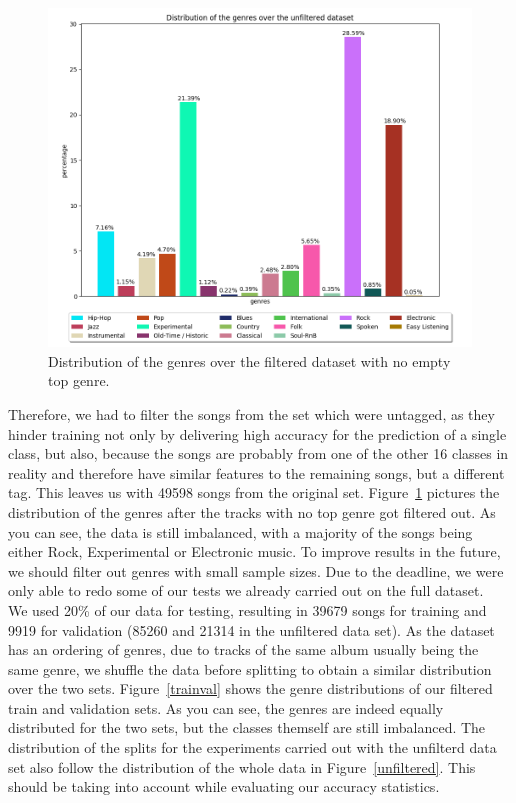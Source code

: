 \begin{figure}[]
	\centering
	\includegraphics[width=1.0\textwidth]{images/genredistfiltered.png}
	\caption{Distribution of the genres over the filtered dataset with no empty
	top genre.}	
	\label{filtered}
\end{figure}

Therefore, we had to filter the songs from the set which were untagged,
as they hinder training not only by delivering high accuracy for the
prediction of a single class, but also, because the songs are probably
from one of the other 16 classes in reality and therefore have similar
features to the remaining songs, but a different tag. This leaves us
with 49598 songs from the original set. Figure~\ref{filtered} pictures
the distribution of the genres after the tracks with no top genre got
filtered out. As you can see, the data is still imbalanced, with a
majority of the songs being either Rock, Experimental or Electronic
music. To improve results in the future, we should filter out genres
with small sample sizes. Due to the deadline, we were only able to redo
some of our tests we already carried out on the full dataset.\\
We used 20\% of our data for testing, resulting in 39679 songs for
training and 9919 for validation (85260 and 21314 in the unfiltered data
set). As the dataset has an ordering of genres, due to tracks of the
same album usually being the same genre, we shuffle the data before
splitting to obtain a similar distribution over the two sets.
Figure~\ref{trainval} shows the genre distributions of our filtered
train and validation sets. As you can see, the genres are indeed equally
distributed for the two sets, but the classes themself are still
imbalanced. The distribution of the splits for the experiments carried
out with the unfilterd data set also follow the distribution of the
whole data in Figure~\ref{unfiltered}. This should be taking into
account while evaluating our accuracy statistics.

